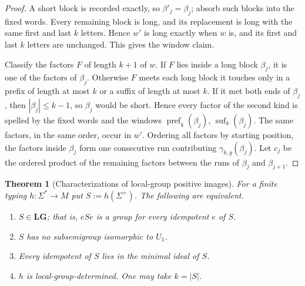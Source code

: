 \documentclass[11pt]{article}
\numberwithin{equation}{section}
\theoremstyle{plain}
\newtheorem{theorem}{Theorem}[section]
\theoremstyle{definition}
\theoremstyle{remark}
\theoremstyle{plain}
\begin{document}
\begin{proof}
A short block is recorded exactly, so $\beta'_j=\beta_j$; absorb such
blocks into the fixed words.  Every remaining block is long, and its
replacement is long with the same first and last $k$ letters.
Hence $w'$ is long exactly when $w$ is, and its first and last $k$
letters are unchanged.  This gives the window claim.

Classify the factors $F$ of length $k+1$ of $w$.  If $F$ lies inside a
long block $\beta_j$, it is one of the factors of $\beta_j$.  Otherwise
$F$ meets each long block it touches only in a prefix of length at most
$k$ or a suffix of length at most $k$.  If it met both ends of
$\beta_j$, then $|\beta_j|\le k-1$, so $\beta_j$ would be short.  Hence
every factor of the second kind is spelled by the fixed words and the
windows $\operatorname{pref}_k(\beta_j)$, $\operatorname{suf}_k(\beta_j)$.
The same factors, in the same order, occur in $w'$.  Ordering all
factors by starting position, the factors inside $\beta_j$ form one
consecutive run contributing $\gamma_{k,g}(\beta_j)$.  Let $c_j$ be the
ordered product of the remaining factors between the runs of
$\beta_j$ and $\beta_{j+1}$.
\end{proof}

\begin{theorem}[Characterizations of local-group positive images]
\label{thm:lg-characterization-v82}
For a finite typing $h:\Sigma^*\to M$ put $S:=h(\Sigma^+)$.
The following are equivalent.
\begin{enumerate}[label=\textup{(\roman*)},leftmargin=*]
\item $S\in\mathbf{LG}$; that is, $eSe$ is a group for every idempotent
$e$ of $S$.
\item $S$ has no subsemigroup isomorphic to $U_1$.
\item Every idempotent of $S$ lies in the minimal ideal of $S$.
\item $h$ is local-group-determined.  One may take $k=|S|$.
\end{enumerate}
\end{theorem}
\end{document}

